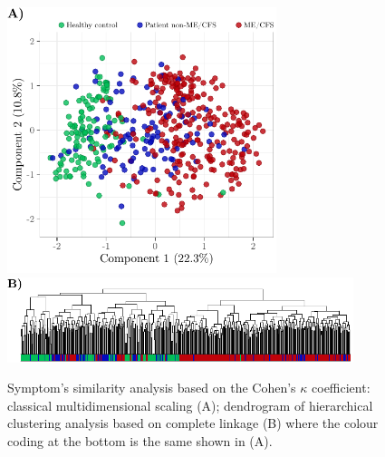 \begin{figure}[h!]
    \centering
    \includegraphics[width=0.7\textwidth]{chapter/2021-statistical-challenges/figures/figure-MDS.pdf}
    \hspace*{-0.54cm}
    \includegraphics[width=0.9\textwidth]{chapter/2021-statistical-challenges/figures/figure-dendrogram.pdf}
    \caption[Symptom's similarity analysis based on the Cohen's $\kappa$ coefficient]{Symptom's similarity analysis based on the Cohen's $\kappa$ coefficient: classical multidimensional scaling (A); dendrogram of hierarchical clustering analysis based on complete linkage (B) where the colour coding at the bottom is the same shown in (A).}
    \label{fig:cohens-mds-and-dendrogram}
\end{figure}

